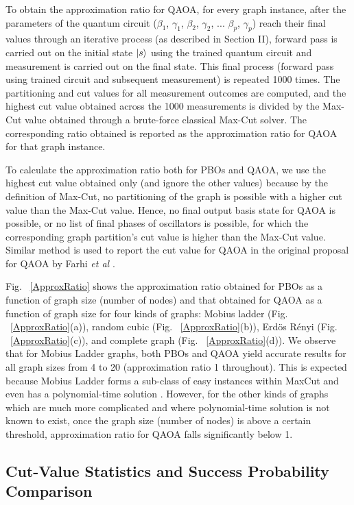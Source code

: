 \documentclass[%
 reprint,
 amsmath,amssymb,
 aps,
]{revtex4-2}
\begin{document}
To obtain the approximation ratio for QAOA, for every graph instance, after the 
parameters of the quantum circuit ($\beta_1$, $\gamma_1$, $\beta_2$, $\gamma_2$, ... $\beta_p$, $\gamma_p$) reach their final values through an iterative process (as described in Section II), forward pass is carried out on the initial state $\ket{s}$  using the trained quantum circuit and measurement is carried out on the final state. This final process (forward pass using trained circuit and subsequent measurement) is repeated 1000 times. The partitioning and cut values for all measurement outcomes are computed, and the highest cut value obtained across the 1000 measurements is divided by the Max-Cut value obtained through a brute-force classical Max-Cut solver. The corresponding ratio obtained is reported as the approximation ratio for QAOA for that graph instance.

To calculate the approximation ratio both for PBOs and QAOA, we use the highest cut value obtained only (and ignore the other values) because by the definition of Max-Cut, no partitioning of the graph is possible with a higher cut value than the Max-Cut value. Hence, no final output basis state for QAOA is possible, or no list of final phases of oscillators is possible, for which the corresponding graph partition's cut value is higher than the Max-Cut value. Similar method is used to report the cut value for QAOA in the original proposal for QAOA by Farhi \textit{et al} \citep{QAOA_Farhi}.

Fig. ~\ref{ApproxRatio} shows the approximation ratio obtained for PBOs as a function of graph size (number of nodes) and that obtained for QAOA as a function of graph size for four kinds of graphs: Mobius ladder (Fig. ~\ref{ApproxRatio}(a)), random cubic (Fig. ~\ref{ApproxRatio}(b)), Erd{\"o}s R{\'e}nyi (Fig. ~\ref{ApproxRatio}(c)),  and complete graph (Fig. ~\ref{ApproxRatio}(d)). We observe that for Mobius Ladder graphs, both PBOs and QAOA yield accurate results for all graph sizes from 4 to 20 (approximation ratio 1 throughout). This is expected because Mobius Ladder forms a sub-class of easy instances within MaxCut and even has a polynomial-time solution \citep{MobiusLadder_PolySoln}. However, for the other kinds of graphs which are much more complicated and where polynomial-time solution is not known to exist, once the graph size (number of nodes) is above a certain threshold, approximation ratio for QAOA falls significantly below 1.

\subsection{Cut-Value Statistics and Success Probability Comparison}
\end{document}
